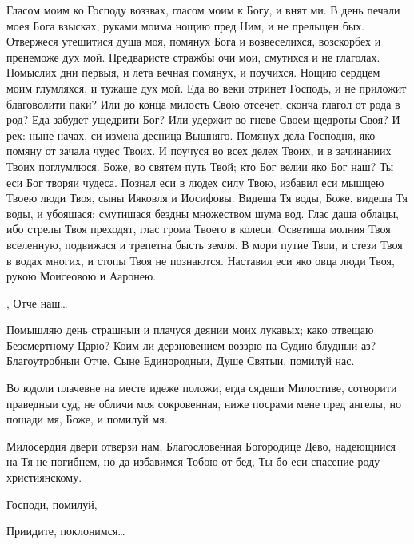 \begin{mymulticols}
Гласом моим ко Господу воззвах, гласом моим к Богу, и внят ми. В день печали моея Бога взысках, руками моима нощию пред Ним, и не прельщен бых. Отвержеся утешитися душа моя, помянух Бога и возвеселихся, возскорбех и пренеможе дух мой. Предваристе стражбы очи мои, смутихся и не глаголах. Помыслих дни первыя, и лета вечная помянух, и поучихся. Нощию сердцем моим глумляхся, и тужаше дух мой. Еда во веки отринет Господь, и не приложит благоволити паки? Или до конца милость Свою отсечет, сконча глагол от рода в род? Еда забудет ущедрити Бог? Или удержит во гневе Своем щедроты Своя? И рех: ныне начах, си измена десница Вышняго. Помянух дела Господня, яко помяну от зачала чудес Твоих. И поучуся во всех делех Твоих, и в зачинаниих Твоих поглумлюся. Боже, во святем путь Твой; кто Бог велии яко Бог наш? Ты еси Бог творяи чудеса. Познал еси в людех силу Твою, избавил еси мышцею Твоею люди Твоя, сыны Ияковля и Иосифовы. Видеша Тя воды, Боже, видеша Тя воды, и убояшася; смутишася бездны множеством шума вод. Глас даша облацы, ибо стрелы Твоя преходят, глас грома Твоего в колеси. Осветиша молния Твоя вселенную, подвижася и трепетна бысть земля. В мори путие Твои, и стези Твоя в водах многих, и стопы Твоя не познаются. Наставил еси яко овца люди Твоя, рукою Моисеовою и Ааронею.

 ,  Отче наш…





Помышляю день страшныи и плачуся деянии моих лукавых; како отвещаю Безсмертному Царю? Коим ли дерзновением воззрю на Судию блудныи аз? Благоутробныи Отче, Сыне Единородныи, Душе Святыи, помилуй нас.

 Во юдоли плачевне на месте идеже положи, егда сядеши Милостиве, сотворити праведныи суд, не обличи моя сокровенная, ниже посрами мене пред ангелы, но пощади мя, Боже, и помилуй мя.

 Милосердия двери отверзи нам, Благословенная Богородице Дево, надеющиися на Тя не погибнем, но да избавимся Тобою от бед, Ты бо еси спасение роду християнскому.

 Господи, помилуй, 

 Приидите, поклонимся… 





\end{mymulticols}
